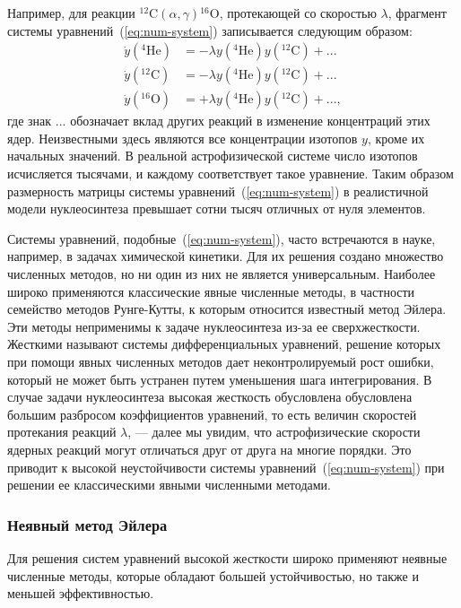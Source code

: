 Например, для реакции \({^{12}}\text{C} (\alpha,\gamma) {^{16}}\text{O}\), протекающей со скоростью $\lambda$, фрагмент системы уравнений~(\ref{eq:num-system}) записывается следующим образом:
\begin{equation}
\begin{aligned}
  \dot{y}({^4}\text{He}) &= - \lambda y({^4}\text{He})y({^{12}}\text{C}) + ...\\
  \dot{y}({^{12}}\text{C}) &= - \lambda y({^4}\text{He})y({^{12}}\text{C}) + ...\\
  \dot{y}({^{16}}\text{O}) &= + \lambda y({^4}\text{He})y({^{12}}\text{C}) + ...,
\end{aligned}
\end{equation}
где знак $...$ обозначает вклад других реакций в изменение концентраций этих ядер. Неизвестными здесь являются все концентрации изотопов $y$, кроме их начальных значений. В реальной астрофизической системе число изотопов исчисляется тысячами, и каждому соответствует такое уравнение. Таким образом размерность матрицы системы уравнений~(\ref{eq:num-system}) в реалистичной модели нуклеосинтеза превышает сотни тысяч отличных от нуля элементов.

Системы уравнений, подобные~(\ref{eq:num-system}), часто встречаются в науке, например, в задачах химической кинетики. Для их решения создано множество численных методов, но ни один из них не является универсальным. Наиболее широко применяются классические явные численные методы, в частности семейство методов Рунге-Кутты, к которым относится известный метод Эйлера. Эти методы неприменимы к задаче нуклеосинтеза из-за ее сверхжесткости. Жесткими называют системы дифференциальных уравнений, решение которых при помощи явных численных методов дает неконтролируемый рост ошибки, который не может быть устранен путем уменьшения шага интегрирования. В случае задачи нуклеосинтеза высокая жесткость обусловлена обусловлена большим разбросом коэффициентов уравнений, то есть величин скоростей протекания реакций $\lambda$, --- далее мы увидим, что астрофизические скорости ядерных реакций могут отличаться друг от друга на многие порядки. Это приводит к высокой неустойчивости системы уравнений~(\ref{eq:num-system}) при решении ее классическими явными численными методами.

\subsubsection{Неявный метод Эйлера}
Для решения систем уравнений высокой жесткости широко применяют неявные численные методы, которые обладают большей устойчивостью, но также и меньшей эффективностью.

